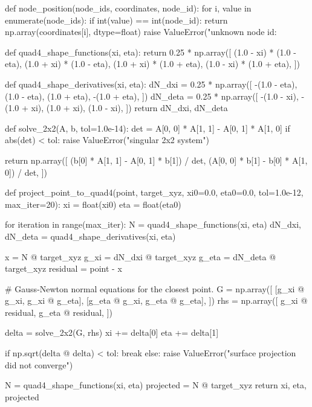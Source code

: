 \begin{python}
def node_position(node_ids, coordinates, node_id):
    for i, value in enumerate(node_ids):
        if int(value) == int(node_id):
            return np.array(coordinates[i], dtype=float)
    raise ValueError("unknown node id: %


def quad4_shape_functions(xi, eta):
    return 0.25 * np.array([
        (1.0 - xi) * (1.0 - eta),
        (1.0 + xi) * (1.0 - eta),
        (1.0 + xi) * (1.0 + eta),
        (1.0 - xi) * (1.0 + eta),
    ])


def quad4_shape_derivatives(xi, eta):
    dN_dxi = 0.25 * np.array([
        -(1.0 - eta),
         (1.0 - eta),
         (1.0 + eta),
        -(1.0 + eta),
    ])
    dN_deta = 0.25 * np.array([
        -(1.0 - xi),
        -(1.0 + xi),
         (1.0 + xi),
         (1.0 - xi),
    ])
    return dN_dxi, dN_deta


def solve_2x2(A, b, tol=1.0e-14):
    det = A[0, 0] * A[1, 1] - A[0, 1] * A[1, 0]
    if abs(det) < tol:
        raise ValueError("singular 2x2 system")

    return np.array([
        (b[0] * A[1, 1] - A[0, 1] * b[1]) / det,
        (A[0, 0] * b[1] - b[0] * A[1, 0]) / det,
    ])


def project_point_to_quad4(point, target_xyz,
                           xi0=0.0, eta0=0.0,
                           tol=1.0e-12, max_iter=20):
    xi = float(xi0)
    eta = float(eta0)

    for iteration in range(max_iter):
        N = quad4_shape_functions(xi, eta)
        dN_dxi, dN_deta = quad4_shape_derivatives(xi, eta)

        x = N @ target_xyz
        g_xi = dN_dxi @ target_xyz
        g_eta = dN_deta @ target_xyz
        residual = point - x

        # Gauss-Newton normal equations for the closest point.
        G = np.array([
            [g_xi @ g_xi,   g_xi @ g_eta],
            [g_eta @ g_xi,  g_eta @ g_eta],
        ])
        rhs = np.array([
            g_xi @ residual,
            g_eta @ residual,
        ])

        delta = solve_2x2(G, rhs)
        xi += delta[0]
        eta += delta[1]

        if np.sqrt(delta @ delta) < tol:
            break
    else:
        raise ValueError("surface projection did not converge")

    N = quad4_shape_functions(xi, eta)
    projected = N @ target_xyz
    return xi, eta, projected



\end{python}
